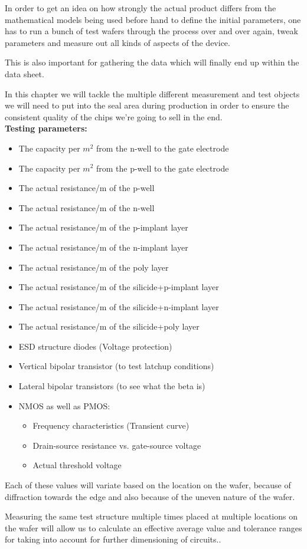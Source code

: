 In order to get an idea on how strongly the actual product differs from the mathematical models being used before hand to define the initial parameters, one has to run a bunch of test wafers through the process over and over again, tweak parameters and measure out all kinds of aspects of the device.

This is also important for gathering the data which will finally end up within the data sheet.

In this chapter we will tackle the multiple different measurement and test objects we will need to put into the seal area during production in order to ensure the consistent quality of the chips we're going to sell in the end.\\



\textbf{Testing parameters:}
\begin{itemize}
	\item The capacity per $m^2$ from the n-well to the gate electrode
	\item The capacity per $m^2$ from  the p-well to the gate electrode
	\item The actual resistance/m of the p-well
	\item The actual resistance/m of the n-well
	\item The actual resistance/m of the p-implant layer
	\item The actual resistance/m of the n-implant layer
	\item The actual resistance/m of the poly layer
	\item The actual resistance/m of the silicide+p-implant layer
	\item The actual resistance/m of the silicide+n-implant layer
	\item The actual resistance/m of the silicide+poly layer
	\item ESD structure diodes (Voltage protection)
	\item Vertical bipolar transistor (to test latchup conditions)
	\item Lateral bipolar transistors (to see what the beta is)
	\item NMOS as well as PMOS:
	\begin{itemize}
		\item Frequency characteristics (Transient curve)
		\item Drain-source resistance vs. gate-source voltage
		\item Actual threshold voltage
	\end{itemize}
\end{itemize}

Each of these values will variate based on the location on the wafer, because of diffraction towards the edge and also because of the uneven nature of the wafer.

Measuring the same test structure multiple times placed at multiple locations on the wafer will allow us to calculate an effective average value and tolerance ranges for taking into account for further dimensioning of circuits..
